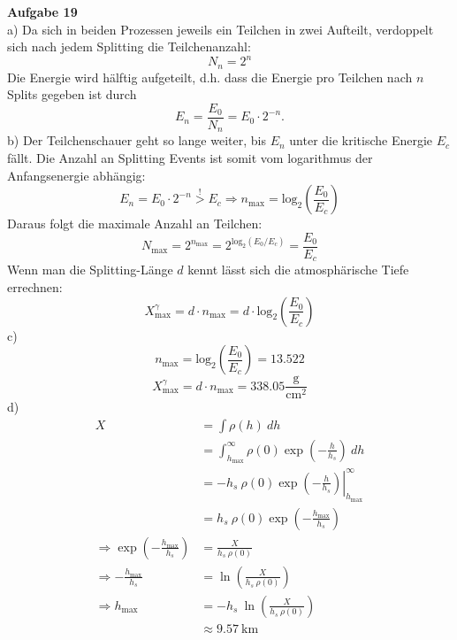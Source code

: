 \documentclass[11pt, a4paper]{article}
\begin{document}
\thispagestyle{fancy}
\noindent
{\large\textbf{Aufgabe 19}} \\[0.2cm]
a) Da sich in beiden Prozessen jeweils ein Teilchen in zwei Aufteilt, verdoppelt sich nach jedem Splitting
die Teilchenanzahl:
\[ N_n = 2^n \]
Die Energie wird hälftig aufgeteilt, d.h. dass die Energie pro Teilchen nach $n$ Splits gegeben ist durch
\[ E_n = \frac{E_0}{N_n} = E_0 \cdot 2^{-n}. \]
b) Der Teilchenschauer geht so lange weiter, bis $E_n$ unter die kritische Energie $E_c$ fällt. Die Anzahl an
Splitting Events ist somit vom logarithmus der Anfangsenergie abhängig:
\[ 
	E_n = E_0 \cdot 2^{-n} \overset !> E_c 
	\Rightarrow
	n_\text{max} = \text{log}_2 \left( \frac{E_0}{E_c} \right)
\]
Daraus folgt die maximale Anzahl an Teilchen:
\[
	N_\text{max} = 2^{n_\text{max}} = 2^{\text{log}_2 (E_0 / E_c )} = \frac{E_0}{E_c} 
\]
Wenn man die Splitting-Länge $d$ kennt lässt sich die atmosphärische Tiefe errechnen:
\[ X_\text{max}^\gamma = d \cdot n_\text{max} = d \cdot \text{log}_2 \left( \frac{E_0}{E_c} \right) \]
c) 
\[ n_\text{max} = \text{log}_2 \left( \frac{E_0}{E_c} \right) = 13.522 \]
\[ X_\text{max}^\gamma = d \cdot n_\text{max} = 338.05 \frac{\text{g}}{\text{cm}^2} \]
d)
\begin{align*}
	X
	&= \int \rho(h) \ dh \\
	&= \int_{h_\text{max}}^\infty \rho(0) \exp \left(-\frac{h}{h_s} \right) \ dh \\
	&= \left. -h_s \ \rho(0) \exp \left(-\frac{h}{h_s} \right) \right|_{h_\text{max}}^\infty \\
	&= h_s \ \rho(0) \exp \left(-\frac{h_\text{max}}{h_s} \right) \\
	\Rightarrow
	\exp \left(-\frac{h_\text{max}}{h_s} \right)
	&= \frac{X}{h_s \ \rho(0)} \\
	\Rightarrow
	-\frac{h_\text{max}}{h_s}
	&= \ln \left( \frac{X}{h_s \ \rho(0)} \right) \\
	\Rightarrow
	h_\text{max}
	&= -h_s \ \ln \left( \frac{X}{h_s \ \rho(0)} \right) \\
	&\approx 9.57 \ \text{km}
\end{align*}
\end{document}
